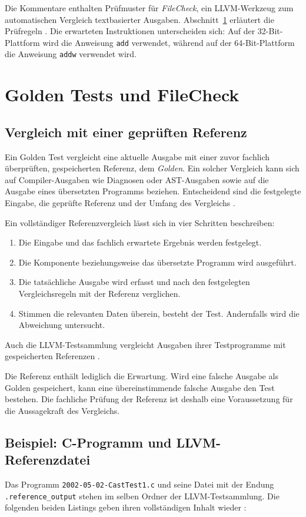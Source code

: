 \documentclass[11pt,a4paper]{article}
\newcommand{\code}[1]{\texttt{#1}}
\begin{document}
Die Kommentare enthalten Prüfmuster für \emph{FileCheck}, ein LLVM-Werkzeug zum automatischen Vergleich textbasierter Ausgaben. Abschnitt~\ref{sec:golden} erläutert die Prüfregeln \parencite{filecheck}. Die erwarteten Instruktionen unterscheiden sich: Auf der 32-Bit-Plattform wird die Anweisung \texttt{add} verwendet, während auf der 64-Bit-Plattform die Anweisung \texttt{addw} verwendet wird. 

\section{Golden Tests und FileCheck}\label{sec:golden}
\subsection{Vergleich mit einer geprüften Referenz}
Ein Golden Test vergleicht eine aktuelle Ausgabe mit einer zuvor fachlich überprüften, gespeicherten Referenz, dem \emph{Golden}. Ein solcher Vergleich kann sich auf Compiler-Ausgaben wie Diagnosen oder AST-Ausgaben sowie auf die Ausgabe eines übersetzten Programms beziehen. Entscheidend sind die festgelegte Eingabe, die geprüfte Referenz und der Umfang des Vergleichs \parencite{clang,suiteguide}.

Ein vollständiger Referenzvergleich lässt sich in vier Schritten beschreiben: 
\begin{enumerate}
    \item Die Eingabe und das fachlich erwartete Ergebnis werden festgelegt.
    \item Die Komponente beziehungsweise das übersetzte Programm
          wird ausgeführt.
    \item Die tatsächliche Ausgabe wird erfasst und nach den festgelegten
          Vergleichsregeln mit der Referenz verglichen.
    \item Stimmen die relevanten Daten überein, besteht der Test.
          Andernfalls wird die Abweichung untersucht.
\end{enumerate}
Auch die LLVM-Testsammlung vergleicht Ausgaben ihrer Testprogramme mit gespeicherten Referenzen \parencite{suiteguide}.

Die Referenz enthält lediglich die Erwartung. Wird eine falsche Ausgabe als Golden gespeichert, kann eine übereinstimmende falsche Ausgabe den Test bestehen. Die fachliche Prüfung der Referenz ist deshalb eine Voraussetzung für die Aussagekraft des Vergleichs.

\subsection{Beispiel: C-Programm und LLVM-Referenzdatei}
Das Programm \code{2002-05-02-CastTest1.c} und seine Datei mit der Endung \code{.reference\_output} stehen im selben Ordner der LLVM-Testsammlung. Die folgenden beiden Listings geben ihren vollständigen Inhalt wieder \parencite{goldenc}:
\end{document}
